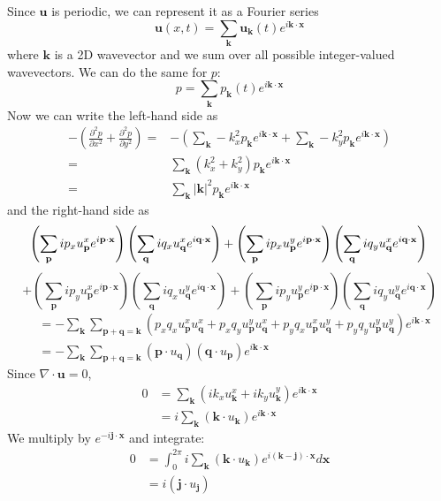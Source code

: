 \documentclass[12pt]{article}
\begin{document}
Since $\mathbf{u}$ is periodic, we can represent it as a Fourier series
\[
\mathbf{u}(x,t)=\sum_{\mathbf{k}}\mathbf{u_k}(t)e^{i\mathbf{k\cdot{x}}}
\]
where $\mathbf{k}$ is a 2D wavevector and we sum over all possible integer-valued wavevectors. We can do the same for $p$:
\[
p=\sum_{\mathbf{k}}p_\mathbf{k}(t)e^{i\mathbf{k\cdot{x}}}
\]
Now we can write the left-hand side as
\begin{align*}
 -\left(\frac{\partial^2p}{\partial{x}^2}+\frac{\partial^2p}{\partial{y}^2}\right)=&-\left(\sum_\mathbf{k}-k_x^2p_\mathbf{k}e^{i\mathbf{k\cdot{x}}}+\sum_\mathbf{k}-k_y^2p_\mathbf{k}e^{i\mathbf{k\cdot{x}}}\right)\\
 =&\sum_\mathbf{k}(k_x^2+k_y^2)p_\mathbf{k}e^{i\mathbf{k\cdot{x}}}\\
 =&\sum_\mathbf{k}|\mathbf{k}|^2p_\mathbf{k}e^{i\mathbf{k\cdot{x}}}
\end{align*}
and the right-hand side as
\[
\left(\sum_\mathbf{p}ip_xu_\mathbf{p}^xe^{i\mathbf{p\cdot{x}}}\right)\left(\sum_\mathbf{q}iq_xu_\mathbf{q}^xe^{i\mathbf{q\cdot{x}}}\right)
+\left(\sum_\mathbf{p}ip_xu_\mathbf{p}^ye^{i\mathbf{p\cdot{x}}}\right)\left(\sum_\mathbf{q}iq_yu_\mathbf{q}^xe^{i\mathbf{q\cdot{x}}}\right)\\
\]
\[
+\left(\sum_\mathbf{p}ip_yu_\mathbf{p}^xe^{i\mathbf{p\cdot{x}}}\right)\left(\sum_\mathbf{q}iq_xu_\mathbf{q}^ye^{i\mathbf{q\cdot{x}}}\right)
+\left(\sum_\mathbf{p}ip_yu_\mathbf{p}^ye^{i\mathbf{p\cdot{x}}}\right)\left(\sum_\mathbf{q}iq_yu_\mathbf{q}^ye^{i\mathbf{q\cdot{x}}}\right)\]
\begin{align*}
&=-\sum_\mathbf{k}\sum_\mathbf{p+q=k}(p_xq_xu_\mathbf{p}^xu_\mathbf{q}^x+p_xq_yu_\mathbf{p}^yu_\mathbf{q}^x+p_yq_xu_\mathbf{p}^xu_\mathbf{q}^y+p_yq_yu_\mathbf{p}^yu_\mathbf{q}^y)e^{i\mathbf{k\cdot{x}}}\\
&=-\sum_\mathbf{k}\sum_\mathbf{p+q=k}(\mathbf{p}\cdot{u}_\mathbf{q})(\mathbf{q}\cdot{u}_\mathbf{p})e^{i\mathbf{k\cdot{x}}}
\end{align*}
Since $\nabla\cdot\mathbf{u}=0$,
\begin{align*}
0&=\sum_\mathbf{k}(ik_xu_\mathbf{k}^x+ik_yu_\mathbf{k}^y)e^{i\mathbf{k\cdot{x}}}\\
&=i\sum_\mathbf{k}(\mathbf{k}\cdot{u}_\mathbf{k})e^{i\mathbf{k\cdot{x}}}
\end{align*}
We multiply by $e^{-i\mathbf{j\cdot{x}}}$ and integrate:
\begin{align*}
0&=\int^{2\pi}_0i\sum_\mathbf{k}(\mathbf{k}\cdot{u}_\mathbf{k})e^{i(\mathbf{k-j})\cdot\mathbf{x}}d\mathbf{x}\\
&=i(\mathbf{j}\cdot{u}_\mathbf{j})
\end{align*}
\end{document}
